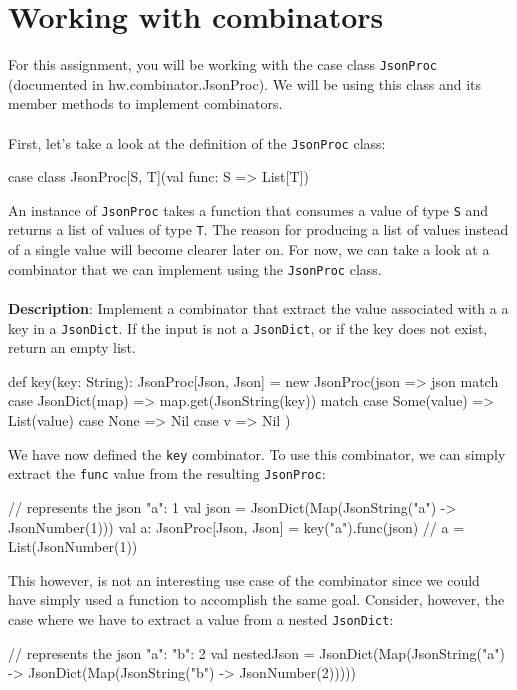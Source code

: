\documentclass[9pt]{extbook}
\begin{document}
\section{Working with combinators}
For this assignment, you will be working with the case class \texttt{JsonProc}
(documented in hw.combinator.JsonProc). We will be using this class and its 
member methods to implement combinators. 
\\ \\
\noindent First, let's take a look at the definition of the \texttt{JsonProc}
class:
\begin{scalacode}
case class JsonProc[S, T](val func: S => List[T])
\end{scalacode}
An instance of \texttt{JsonProc} takes a function that consumes a value of type
\texttt{S} and returns a list of values of type \texttt{T}. The reason for
producing a list of values instead of a single value will become clearer later
on. For now, we can take a look at a combinator that we can implement using
the \texttt{JsonProc} class. 
\\ \\
\noindent \textbf{Description}: Implement a combinator that extract the value
associated with a a key in a \texttt{JsonDict}. If the input is not a
\texttt{JsonDict}, or if the key does not exist, return an empty list.
\begin{scalacode}
def key(key: String): JsonProc[Json, Json] = new JsonProc(json => 
    json match {
      case JsonDict(map) => map.get(JsonString(key)) match {
        case Some(value) => List(value)
        case None => Nil
      }
      case v => Nil
    })
\end{scalacode}
We have now defined the \texttt{key} combinator. To use this combinator, we
can simply extract the \texttt{func} value from the resulting \texttt{JsonProc}:
\begin{scalacode}
// represents the json { "a": 1 }
val json = JsonDict(Map(JsonString("a") -> JsonNumber(1))) 
val a: JsonProc[Json, Json] = key("a").func(json) // a = List(JsonNumber(1))
\end{scalacode}
This however, is not an interesting use case of the combinator since we could
have simply used a function to accomplish the same goal. Consider, however, the
case where we have to extract a value from a nested \texttt{JsonDict}:
\begin{scalacode}
// represents the json { "a": { "b": 2 } }
val nestedJson = JsonDict(Map(JsonString("a") -> JsonDict(Map(JsonString("b") -> JsonNumber(2)))))
\end{scalacode}
\end{document}
